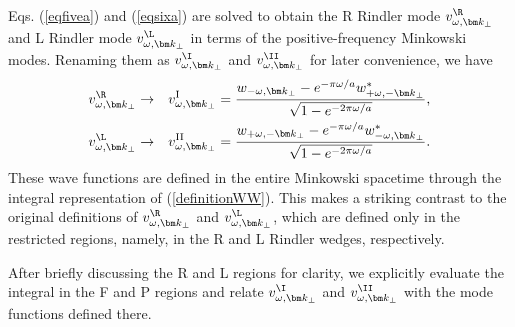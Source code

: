 \documentclass[aps,prd,preprintnumbers,nofootinbib,showpacs]{revtex4}%
\begin{document}
\begin{widetext}
Eqs. (\ref{eqfivea}) and (\ref{eqsixa}) are solved to obtain
the R Rindler mode $v_{\omega,\bm k_\perp}^{\R}$ and
L Rindler mode $v_{\omega,\bm k_\perp}^{\L}$ in terms of the positive-frequency Minkowski
modes. Renaming them as $v_{\omega,\bm k_\perp}^{\I}$ and $v_{\omega,\bm k_\perp}^{\II}$ for later
convenience,
we have
\begin{eqnarray}
v_{\omega,\bm k_\perp}^{\R} &\rightarrow& v^{\rm I}_{\omega,{\bm k}_\perp}
=  \frac{w_{-\omega, {\bm k}_\perp} - e^{-\pi\omega/a}w_{+\omega,-{\bm k}_\perp}^{*}}{\sqrt{ 1 - e^{-2\pi\omega/a}}},
\label{eqfiveai}
\\
v_{\omega,\bm k_\perp}^{\L} &\rightarrow&v^{\rm II}_{\omega,{\bm k}_\perp}
 =  \frac{w_{+\omega,-{\bm k}_\perp} - e^{-\pi\omega/a}w_{-\omega,{\bm k}_\perp}^{*}}{\sqrt{1-e^{-2\pi \omega/a}}} .
\label{eqsixai}
\end{eqnarray}
These wave functions are 
defined in the entire Minkowski spacetime through the integral representation of (\ref{definitionWW}).
This makes a striking contrast to the original definitions of $v_{\omega,\bm k_\perp}^{\R}$
and $v_{\omega,\bm k_\perp}^{\L}$, which are defined only in the restricted regions, namely,
in the R and L Rindler wedges, respectively.

After briefly discussing the R and L regions for clarity, 
we explicitly evaluate the integral in the F and P regions and relate
  $v_{\omega,\bm k_\perp}^{\I}$ and $v_{\omega,\bm k_\perp}^{\II}$
 with the mode functions defined there.




\end{widetext}
\end{document}

